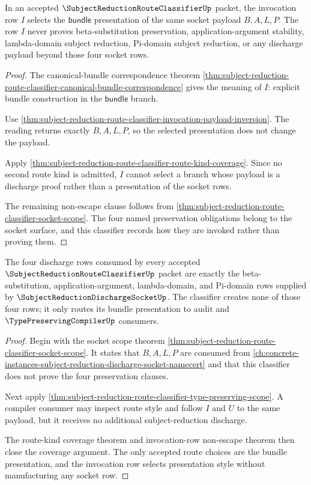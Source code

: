 \begin{theorem}
\label{thm:subject-reduction-route-classifier-invocation-row-nonescape}
In an accepted $\SubjectReductionRouteClassifierUp$ packet, the invocation row $I$ selects the $\mathsf{bundle}$ presentation of the same socket payload $B,A,L,P$. The row $I$ never proves beta-substitution preservation, application-argument stability, lambda-domain subject reduction, Pi-domain subject reduction, or any discharge payload beyond those four socket rows.
\end{theorem}
\begin{proof}
The canonical-bundle correspondence theorem \autoref{thm:subject-reduction-route-classifier-canonical-bundle-correspondence} gives the meaning of $I$: explicit bundle construction in the $\mathsf{bundle}$ branch.

Use \autoref{thm:subject-reduction-route-classifier-invocation-payload-inversion}. The reading returns exactly $B,A,L,P$, so the selected presentation does not change the payload.

Apply \autoref{thm:subject-reduction-route-classifier-route-kind-coverage}. Since no second route kind is admitted, $I$ cannot select a branch whose payload is a discharge proof rather than a presentation of the socket rows.

The remaining non-escape clause follows from \autoref{thm:subject-reduction-route-classifier-socket-scope}. The four named preservation obligations belong to the socket surface, and this classifier records how they are invoked rather than proving them.
\end{proof}

\begin{theorem}
\label{thm:subject-reduction-route-classifier-socket-payload-coverage}
The four discharge rows consumed by every accepted $\SubjectReductionRouteClassifierUp$ packet are exactly the beta-substitution, application-argument, lambda-domain, and Pi-domain rows supplied by $\SubjectReductionDischargeSocketUp$. The classifier creates none of those four rows; it only routes its bundle presentation to audit and $\TypePreservingCompilerUp$ consumers.
\end{theorem}
\begin{proof}
Begin with the socket scope theorem \autoref{thm:subject-reduction-route-classifier-socket-scope}. It states that $B,A,L,P$ are consumed from \autoref{ch:concrete-instances-subject-reduction-discharge-socket-namecert} and that this classifier does not prove the four preservation clauses.

Next apply \autoref{thm:subject-reduction-route-classifier-type-preserving-scope}. A compiler consumer may inspect route style and follow $I$ and $U$ to the same payload, but it receives no additional subject-reduction discharge.

The route-kind coverage theorem and invocation-row non-escape theorem then close the coverage argument. The only accepted route choices are the bundle presentation, and the invocation row selects presentation style without manufacturing any socket row.
\end{proof}

